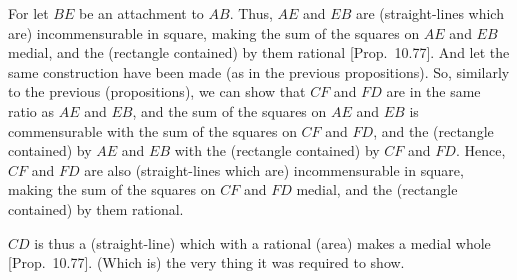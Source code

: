 \begin{Parallel}{}{}
{For let $BE$ be an attachment to $AB$. Thus, $AE$ and
$EB$ are (straight-lines which are) incommensurable in square, making the sum of the
squares on $AE$ and $EB$ medial,  and the (rectangle contained)
by them rational [Prop.~10.77]. 
And let the same construction have been made (as in the previous propositions).
So, similarly
to the previous  (propositions), we can  show that $CF$ and $FD$
are in the same ratio as $AE$ and $EB$, and the sum of the squares
on $AE$ and $EB$ is commensurable with the sum of the squares on
$CF$ and $FD$, and the (rectangle contained) by $AE$ and $EB$
with the (rectangle contained) by $CF$ and $FD$. Hence, $CF$ and
$FD$ are also (straight-lines which are) incommensurable in square, making the sum of the
squares on $CF$ and $FD$ medial, and the (rectangle contained) by them
rational.

$CD$ is thus a (straight-line) which with a rational (area) makes a
medial whole [Prop.~10.77]. (Which is)
the very thing it was required to show.}
\end{Parallel}

